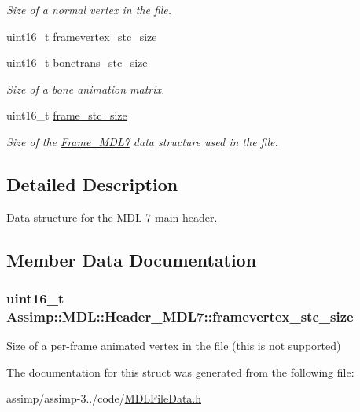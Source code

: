\begin{DoxyCompactItemize}
\begin{DoxyCompactList}\small\item\em Size of a normal vertex in the file. \end{DoxyCompactList}\item 
uint16\+\_\+t \hyperlink{struct_assimp_1_1_m_d_l_1_1_header___m_d_l7_a2fb9ea698d9c85c884fae481c3da013e}{framevertex\+\_\+stc\+\_\+size}
\item 
\hypertarget{struct_assimp_1_1_m_d_l_1_1_header___m_d_l7_a7c915457ab491ef4a9a4ebe34482af07}{uint16\+\_\+t \hyperlink{struct_assimp_1_1_m_d_l_1_1_header___m_d_l7_a7c915457ab491ef4a9a4ebe34482af07}{bonetrans\+\_\+stc\+\_\+size}}\label{struct_assimp_1_1_m_d_l_1_1_header___m_d_l7_a7c915457ab491ef4a9a4ebe34482af07}

\begin{DoxyCompactList}\small\item\em Size of a bone animation matrix. \end{DoxyCompactList}\item 
\hypertarget{struct_assimp_1_1_m_d_l_1_1_header___m_d_l7_a842ef093f61dfb3a83bd8dc120cd7f65}{uint16\+\_\+t \hyperlink{struct_assimp_1_1_m_d_l_1_1_header___m_d_l7_a842ef093f61dfb3a83bd8dc120cd7f65}{frame\+\_\+stc\+\_\+size}}\label{struct_assimp_1_1_m_d_l_1_1_header___m_d_l7_a842ef093f61dfb3a83bd8dc120cd7f65}

\begin{DoxyCompactList}\small\item\em Size of the \hyperlink{struct_assimp_1_1_m_d_l_1_1_frame___m_d_l7}{Frame\+\_\+\+M\+D\+L7} data structure used in the file. \end{DoxyCompactList}\end{DoxyCompactItemize}


\subsection{Detailed Description}
Data structure for the M\+D\+L 7 main header. 

\subsection{Member Data Documentation}
\hypertarget{struct_assimp_1_1_m_d_l_1_1_header___m_d_l7_a2fb9ea698d9c85c884fae481c3da013e}{
\subsubsection[{framevertex\+\_\+stc\+\_\+size}]{\setlength{\rightskip}{0pt plus 5cm}uint16\+\_\+t Assimp\+::\+M\+D\+L\+::\+Header\+\_\+\+M\+D\+L7\+::framevertex\+\_\+stc\+\_\+size}}\label{struct_assimp_1_1_m_d_l_1_1_header___m_d_l7_a2fb9ea698d9c85c884fae481c3da013e}
Size of a per-\/frame animated vertex in the file (this is not supported) 

The documentation for this struct was generated from the following file\+:\begin{DoxyCompactItemize}
\item 
assimp/assimp-\/3../code/\hyperlink{_m_d_l_file_data_8h}{M\+D\+L\+File\+Data.\+h}\end{DoxyCompactItemize}
